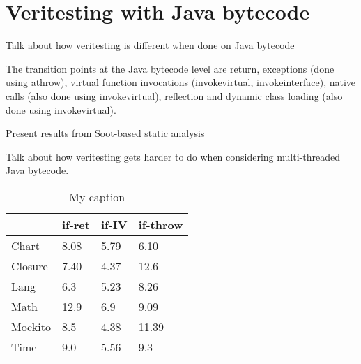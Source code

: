 \section{Veritesting with Java bytecode}
Talk about how veritesting is different when done on Java bytecode

The transition points at the Java bytecode level are return, exceptions (done using athrow), virtual function invocations (invokevirtual, invokeinterface), native calls (also done using invokevirtual), reflection and dynamic class loading (also done using invokevirtual).

Present results from Soot-based static analysis

Talk about how veritesting gets harder to do when considering multi-threaded Java bytecode.


\begin{table}[]
\centering
\caption{My caption}
\label{my-label}
\begin{tabular}{|l|l|l|l|}
\hline
        & if-ret & if-IV & if-throw \\ \hline
Chart   & 8.08   & 5.79  & 6.10     \\ \hline
Closure & 7.40   & 4.37  & 12.6     \\ \hline
Lang    & 6.3    & 5.23  & 8.26     \\ \hline
Math    & 12.9   & 6.9   & 9.09     \\ \hline
Mockito & 8.5    & 4.38  & 11.39    \\ \hline
Time    & 9.0    & 5.56  & 9.3      \\ \hline
\end{tabular}
\end{table}
